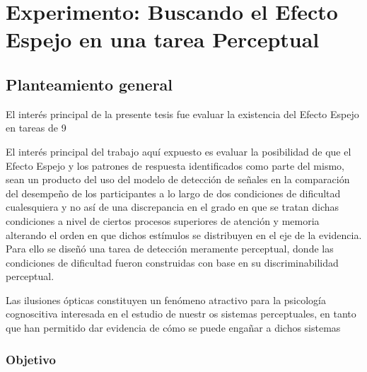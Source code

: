 
\chapter{Experimento: Buscando el Efecto Espejo en una tarea Perceptual} %

\label{Cap_Exp} %

\section{Planteamiento general}

El interés principal de la presente tesis fue evaluar la existencia del Efecto Espejo en tareas de 9

El interés principal del trabajo aquí expuesto es evaluar la posibilidad de que el Efecto Espejo y los patrones de respuesta identificados como parte del mismo, sean un producto del uso del modelo de detección de señales en la comparación del desempeño de los participantes a lo largo de dos condiciones de dificultad cualesquiera y no así de una discrepancia en el grado en que se tratan dichas condiciones a nivel de ciertos procesos superiores de atención y memoria alterando el orden en que dichos estímulos se distribuyen en el eje de la evidencia. Para ello se diseñó una tarea de detección meramente perceptual, donde las condiciones de dificultad fueron construidas con base en su discriminabilidad perceptual. 

Las ilusiones ópticas constituyen un fenómeno atractivo para la psicología cognoscitiva interesada en el estudio de nuestr os sistemas perceptuales, en tanto que han permitido dar evidencia de cómo se puede engañar a dichos sistemas 


\subsection{Objetivo}

